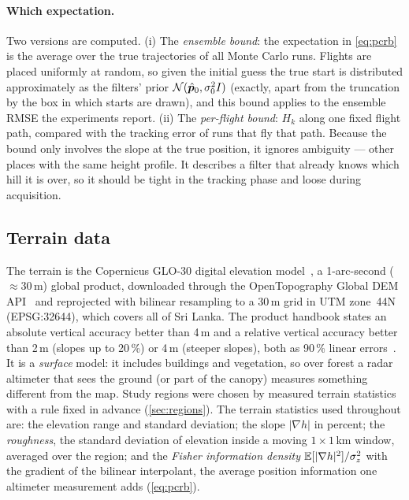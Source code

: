 \paragraph{Which expectation.} Two versions are computed. (i) The \emph{ensemble bound}: the
expectation in \eqref{eq:pcrb} is the average over the true trajectories of all Monte Carlo
runs. Flights are placed uniformly at random, so given the initial guess the true start is
distributed approximately as the filters' prior $\mathcal{N}(\hat{\bm{p}}_0, \sigma_0^2 I)$ (exactly, apart
from the truncation by the box in which starts are drawn), and this bound applies to the ensemble
RMSE the experiments report. (ii) The \emph{per-flight bound}: $H_k$ along one fixed
flight path, compared with the tracking error of runs that fly that path. Because the bound only
involves the slope at the true position, it ignores ambiguity --- other places with the same
height profile. It describes a filter that already knows which hill it is over, so it should be
tight in the tracking phase and loose during acquisition.

\subsection{Terrain data}\label{sec:data}
The terrain is the Copernicus GLO-30 digital elevation model~\cite{copernicus2022}, a
1-arc-second (\(\approx 30\)\,m) global product, downloaded through the OpenTopography Global
DEM API~\cite{opentopo} and reprojected with bilinear resampling to a 30\,m grid in UTM zone~44N
(EPSG:32644), which covers all of Sri Lanka. The product handbook states an absolute vertical
accuracy better than 4\,m and a relative vertical accuracy better than 2\,m (slopes up to
20\,\%) or 4\,m (steeper slopes), both as 90\,\% linear errors~\cite{copernicus2022}. It is a
\emph{surface} model: it includes buildings and vegetation, so over forest a radar altimeter
that sees the ground (or part of the canopy) measures something different from the map. Study
regions were chosen by measured terrain statistics with a rule fixed in advance
(\cref{sec:regions}). The terrain statistics used throughout are:
the elevation range and standard deviation; the slope $|\nabla h|$ in percent; the
\emph{roughness}, the standard deviation of elevation inside a moving $1\times1$\,km window,
averaged over the region; and the \emph{Fisher information density}
$\mathbb{E}[|\nabla h|^2]/\sigma_z^2$ with the gradient of the bilinear interpolant, the average position
information one altimeter measurement adds (\cref{eq:pcrb}).

